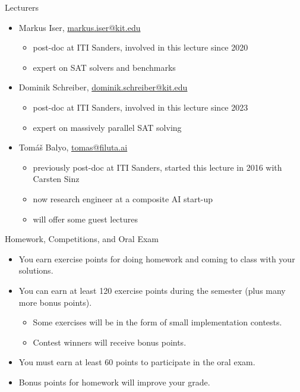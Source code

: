 \documentclass[t]{sdqbeamer}
\begin{document}
\begin{frame}{Lecturers}
\begin{itemize}\setlength{\itemsep}{1em}
	\item Markus Iser, \href{mailto:markus.iser@kit.edu}{markus.iser@kit.edu}
	\begin{itemize}
		\item post-doc at ITI Sanders, involved in this lecture since 2020
		\item expert on SAT solvers and benchmarks
	\end{itemize}
	\item Dominik Schreiber, \href{mailto:dominik.schreiber}{dominik.schreiber@kit.edu}
	\begin{itemize}
		\item post-doc at ITI Sanders, involved in this lecture since 2023
		\item expert on massively parallel SAT solving
	\end{itemize}
	\item Tom\'a\v{s} Balyo, \href{mailto:tomas@filuta.ai}{tomas@filuta.ai}
	\begin{itemize}
		\item previously post-doc at ITI Sanders, started this lecture in 2016 with Carsten Sinz
		\item now research engineer at a composite AI start-up
		\item will offer some guest lectures 
	\end{itemize}
\end{itemize}
\end{frame}

\begin{frame}{Homework, Competitions, and Oral Exam}
\begin{itemize}\setlength{\itemsep}{1em}
	\item You earn exercise points for doing homework and coming to class with your solutions.
	\item You can earn at least 120 exercise points during the semester (plus many more bonus points).
	\begin{itemize}
		\item Some exercises will be in the form of small implementation contests.
		\item Contest winners will receive bonus points.
	\end{itemize}
	\item You must earn at least 60 points to participate in the oral exam.
	\item Bonus points for homework will improve your grade.
\end{itemize}
\end{frame}
\end{document}
